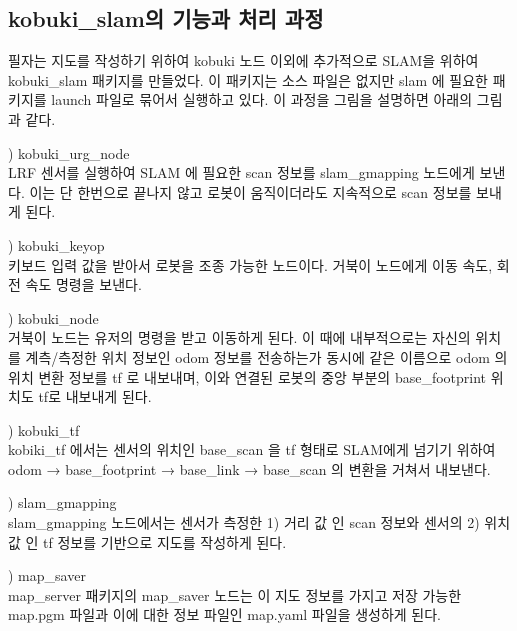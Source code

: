 \subsection{kobuki\_slam의 기능과 처리 과정}

필자는 지도를 작성하기 위하여 kobuki 노드 이외에 추가적으로 SLAM을 위하여 kobuki\_slam 패키지를 만들었다. 이 패키지는 소스 파일은 없지만 slam 에 필요한 패키지를 launch 파일로 묶어서 실행하고 있다. 이 과정을 그림을 설명하면 아래의 그림과 같다.  

\setcounter{num}{0}

\vspace{\baselineskip}
\noindent
{}
\thenum) kobuki\_urg\_node\\
LRF 센서를 실행하여 SLAM 에 필요한 scan 정보를 slam\_gmapping 노드에게 보낸다. 이는 단 한번으로 끝나지 않고 로봇이 움직이더라도 지속적으로 scan 정보를 보내게 된다.

\vspace{\baselineskip}
\noindent
{}
\thenum) kobuki\_keyop\\
키보드 입력 값을 받아서 로봇을 조종 가능한 노드이다. 거북이 노드에게 이동 속도, 회전 속도 명령을 보낸다.

\vspace{\baselineskip}
\noindent
{}
\thenum) kobuki\_node\\
거북이 노드는 유저의 명령을 받고 이동하게 된다. 이 때에 내부적으로는 자신의 위치를 계측/측정한 위치 정보인 odom 정보를 전송하는가 동시에 같은 이름으로 odom 의 위치 변환 정보를 tf 로 내보내며, 이와 연결된 로봇의 중앙 부분의 base\_footprint 위치도 tf로 내보내게 된다.

\vspace{\baselineskip}
\noindent
{}
\thenum) kobuki\_tf\\
kobiki\_tf 에서는 센서의 위치인 base\_scan 을 tf 형태로 SLAM에게 넘기기 위하여 odom → base\_footprint → base\_link → base\_scan 의 변환을 거쳐서 내보낸다.

\vspace{\baselineskip}
\noindent
{}
\thenum) slam\_gmapping\\
slam\_gmapping 노드에서는 센서가 측정한 1) 거리 값 인 scan 정보와 센서의 2) 위치 값 인 tf 정보를 기반으로 지도를 작성하게 된다. 

\vspace{\baselineskip}
\noindent
{}
\thenum) map\_saver\\
map\_server 패키지의 map\_saver 노드는 이 지도 정보를 가지고 저장 가능한 map.pgm 파일과 이에 대한 정보 파일인 map.yaml 파일을 생성하게 된다.

